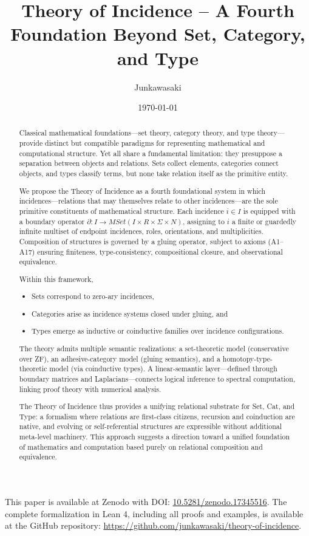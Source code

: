 \documentclass{article}
\title{Theory of Incidence -- A Fourth Foundation Beyond Set, Category, and Type}
\author{Junkawasaki}
\date{\today}
\begin{document}
\maketitle

This paper is available at Zenodo with DOI: \href{https://doi.org/10.5281/zenodo.17345516}{10.5281/zenodo.17345516}. The complete formalization in Lean 4, including all proofs and examples, is available at the GitHub repository: \href{https://github.com/junkawasaki/theory-of-incidence}{https://github.com/junkawasaki/theory-of-incidence}.

\begin{abstract}
Classical mathematical foundations—set theory, category theory, and type theory—provide distinct but compatible paradigms for representing mathematical and computational structure. Yet all share a fundamental limitation: they presuppose a separation between objects and relations. Sets collect elements, categories connect objects, and types classify terms, but none take relation itself as the primitive entity.

We propose the Theory of Incidence as a fourth foundational system in which incidences—relations that may themselves relate to other incidences—are the sole primitive constituents of mathematical structure. Each incidence $i \in I$ is equipped with a boundary operator $\partial: I \to MSet(I \times R \times \Sigma \times N)$, assigning to $i$ a finite or guardedly infinite multiset of endpoint incidences, roles, orientations, and multiplicities. Composition of structures is governed by a gluing operator, subject to axioms (A1–A17) ensuring finiteness, type-consistency, compositional closure, and observational equivalence.

Within this framework,
\begin{itemize}
\item Sets correspond to zero-ary incidences,
\item Categories arise as incidence systems closed under gluing, and
\item Types emerge as inductive or coinductive families over incidence configurations.
\end{itemize}

The theory admits multiple semantic realizations: a set-theoretic model (conservative over ZF), an adhesive-category model (gluing semantics), and a homotopy-type-theoretic model (via coinductive types). A linear-semantic layer—defined through boundary matrices and Laplacians—connects logical inference to spectral computation, linking proof theory with numerical analysis.

The Theory of Incidence thus provides a unifying relational substrate for Set, Cat, and Type: a formalism where relations are first-class citizens, recursion and coinduction are native, and evolving or self-referential structures are expressible without additional meta-level machinery. This approach suggests a direction toward a unified foundation of mathematics and computation based purely on relational composition and equivalence.
\end{abstract}
\end{document}
